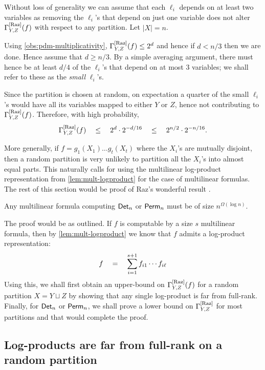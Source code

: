 \begin{proof-sketch}
Without loss of generality we can assume that each $\ell_i$ depends on at least two variables as removing the $\ell_i$'s that depend on just one variable does not alter $\Gamma^{\mathrm{[Raz]}}_{Y,Z}(f)$ with respect to any partition. 
Let $|X| = n$. 

Using \autoref{obs:pdm-multiplicativity}, $\Gamma^{\mathrm{[Raz]}}_{Y,Z}(f) \leq 2^d$ and hence if $d < n/3$ then we are done. 
Hence assume that $d \geq n/3$. 
By a simple averaging argument, there must hence be at least $d/4$ of the $\ell_i$'s that depend on at most $3$ variables; we shall refer to these as the \emph{small} $\ell_i$'s. 

Since the partition is chosen at random, on expectation a quarter of the small $\ell_i$'s would have all its variables mapped to either $Y$ or $Z$, hence not contributing to $\Gamma^{\mathrm{[Raz]}}_{Y,Z}(f)$. 
Therefore, with high probability,
$$
\Gamma^{\mathrm{[Raz]}}_{Y,Z}(f) \quad \leq \quad 2^{d} \cdot 2^{-d/16} \quad \leq \quad 2^{n/2} \cdot 2^{-n/16}.
$$
\end{proof-sketch}

More generally, if $f = g_1(X_1)\dots g_t(X_t)$ where the $X_i$'s are mutually disjoint, then a random partition is very unlikely to partition all the $X_i$'s into almost equal parts. 
This naturally calls for using the multilinear log-product representation from \autoref{lem:mult-logproduct} for the case of multilinear formulas. The rest of this section would be proof of Raz's wonderful result \cite{raz2004}. 

\begin{theorem} \label{thm:raz-ml-det}
Any multilinear formula computing $\operatorname{\mathsf{Det}}_n$ or $\operatorname{\mathsf{Perm}}_n$ must be of size $n^{\Omega(\log n)}$. 
\end{theorem}

The proof would be as outlined. If $f$ is computable by a size $s$ multilinear formula, then by \autoref{lem:mult-logproduct} we know that $f$ admits a log-product representation:
\[
f \quad = \quad \sum_{i=1}^{s+1} f_{i1} \cdots f_{i\ell}
\]
Using this, we shall first obtain an upper-bound on $\Gamma^{\mathrm{[Raz]}}_{Y,Z}(f)$ for a random partition $X = Y \sqcup Z$ by showing that any single log-product is far from full-rank. Finally, for $\operatorname{\mathsf{Det}}_n$ or $\operatorname{\mathsf{Perm}}_n$, we shall prove a lower bound on $\Gamma^{\mathrm{[Raz]}}_{Y,Z}$ for most partitions and that would complete the proof. 

\subsection{Log-products are far from full-rank on a random
  partition}


